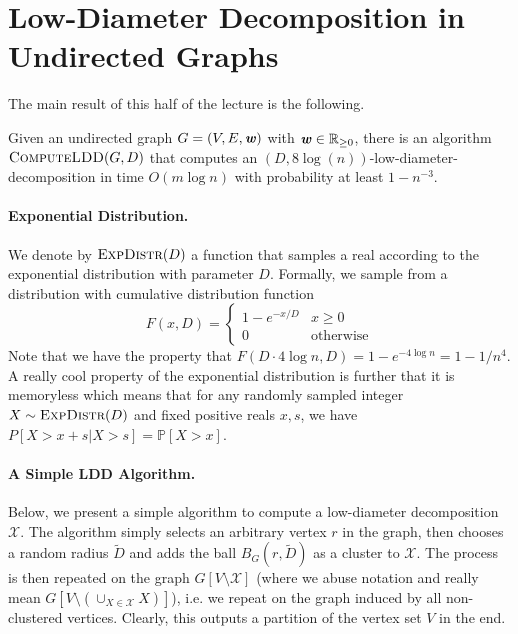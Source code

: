 \section{Low-Diameter Decomposition in Undirected Graphs}

The main result of this half of the lecture is the following.

\begin{theorem}\label{thm:computeLDDguarantees}
Given an undirected graph $G = (V,E,\boldsymbol{\mathit{w}})$ with $\boldsymbol{\mathit{w}} \in \mathbb{R}_{\geq 0}$, there is an algorithm $\textsc{ComputeLDD}(G, D)$ that computes an $(D,  8 \log(n))$-low-diameter-decomposition in time $O(m \log n)$ with probability at least $1-n^{-3}$. 
\end{theorem}

\paragraph{Exponential Distribution.} We denote by $\textsc{ExpDistr}(D)$ a function that samples a real according to the exponential distribution with parameter $D$.  Formally, we sample from a distribution with cumulative distribution function
\[
	F(x, D) = \begin{cases} 1 - e^{-x/D} & x \geq 0 \\ 0 & \text{otherwise} \end{cases}
\]
Note that we have the property that $F(D \cdot 4\log n,  D) = 1 - e^{-4\log n} = 1-1/n^4$.  A really cool property of the exponential distribution is further that it is memoryless which means that for any randomly sampled integer $X \sim \textsc{ExpDistr}(D)$ and fixed positive reals $x,s$, we have $P[X > x + s | X > s] = \mathbb{P}[X > x]$.

\paragraph{A Simple LDD Algorithm.} Below, we present a simple algorithm to compute a low-diameter decomposition $\mathcal{X}$. The algorithm simply selects an arbitrary vertex $r$ in the graph, then chooses a random radius $\tilde{D}$ and adds the ball $B_{G}(r, \tilde{D})$ as a cluster to $\mathcal{X}$. The process is then repeated on the graph $G[V \setminus \mathcal{X}]$ (where we abuse notation and really mean $G[V \setminus (\cup_{X \in \mathcal{X}} X)]$), i.e. we repeat on the graph induced by all non-clustered vertices. Clearly, this outputs a partition of the vertex set $V$ in the end.

